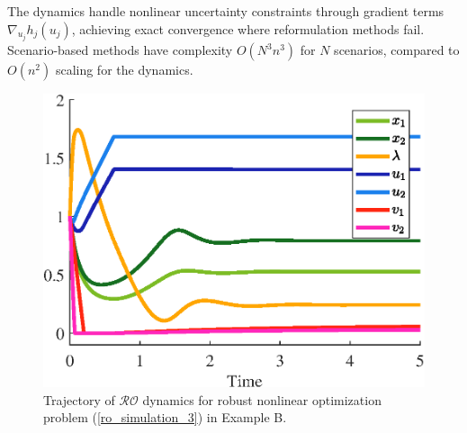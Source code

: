 \documentclass[journal,twoside,web]{ieeecolor}
\newcommand{\rev}[1]{\textcolor{revisionblue}{#1}}
\begin{document}
The dynamics handle nonlinear uncertainty constraints through gradient terms $\nabla_{u_j} h_j(u_j)$, achieving exact convergence where reformulation methods fail. Scenario-based methods have complexity $O(N^3n^3)$ for $N$ scenarios, compared to $O(n^2)$ scaling for the dynamics.
\begin{figure}
\begin{center}
\includegraphics[scale=0.55]{trajectories_nonlinear_exp_no_RC.eps}
\caption{\rev{Trajectory of $\mathcal{RO}$ dynamics for robust nonlinear optimization problem (\ref{ro_simulation_3}) in Example B.}}
\label{trajectories_nonlinear_exp_no_RC}
\end{center}
\end{figure}
\end{document}
